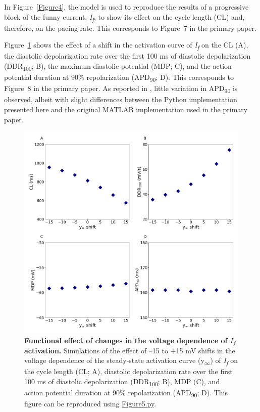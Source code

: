\documentclass[fleqn,10pt]{physiome}
\begin{document}
In Figure~\ref{Figure4}, the model is used to reproduce the results of a progressive block of the funny current, \textit{I\textsubscript{f}}, to show its effect on the cycle length (CL) and, therefore, on the pacing rate. This corresponds to Figure~7 in the primary paper.\newpage



Figure~\ref{Figure5} shows the effect of a shift in the activation curve of \textit{I\textsubscript{f}} on the CL (A), the diastolic depolarization rate over the first 100 ms of diastolic depolarization (DDR\textsubscript{100}; B), the maximum diastolic potential (MDP; C), and the action potential duration at 90\% repolarization (APD\textsubscript{90}; D). This corresponds to Figure~8 in the primary paper. As reported in \citet{fabbri2017computational}, little variation in APD\textsubscript{90} is observed, albeit with slight differences between the Python implementation presented here and the original MATLAB implementation used in the primary paper.

\begin{figure}[htb]
\centering
\includegraphics[width=0.9\linewidth]{Figure5}
\caption{\textbf{Functional effect of changes in the voltage dependence of $I_{f}$ activation.}\newline
Simulations of the effect of –15 to +15 mV shifts in the voltage dependence of the steady‐state activation curve (y\textsubscript{$\infty$}) of \textit{I\textsubscript{f}} on the cycle length (CL; A), diastolic depolarization rate over the first 100 ms of diastolic depolarization (DDR\textsubscript{100}; B), MDP (C), and action potential duration at 90\% repolarization (APD\textsubscript{90}; D). This figure can be reproduced using \href{https://models.physiomeproject.org/workspace/648/rawfile/6784d6c3256c832dc98b2db42c85747ae2596518/Figure5.py}{Figure5.py}.}
\label{Figure5}
\end{figure}
\end{document}

